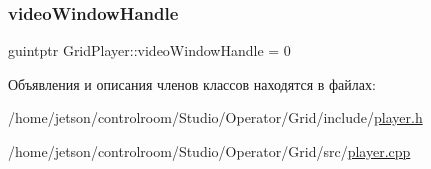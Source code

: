 \subsubsection{\texorpdfstring{video\+Window\+Handle}{videoWindowHandle}}
{\footnotesize\ttfamily guintptr Grid\+Player\+::video\+Window\+Handle = 0\hspace{0.3cm}{\ttfamily [private]}}



Объявления и описания членов классов находятся в файлах\+:\begin{DoxyCompactItemize}
\item 
/home/jetson/controlroom/\+Studio/\+Operator/\+Grid/include/\hyperlink{_operator_2_grid_2include_2player_8h}{player.\+h}\item 
/home/jetson/controlroom/\+Studio/\+Operator/\+Grid/src/\hyperlink{_operator_2_grid_2src_2player_8cpp}{player.\+cpp}\end{DoxyCompactItemize}
